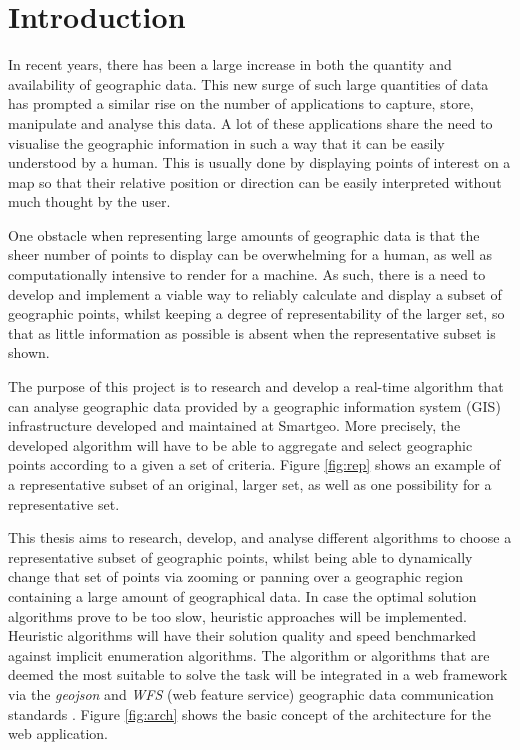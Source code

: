 \chapter{Introduction}
\label{chap:intro}

In recent years, there has been a large increase in both the quantity and availability of geographic data. This new surge of such large quantities of data has prompted a similar rise on the number of applications to capture, store, manipulate and analyse this data.
A lot of these applications share the need to visualise the geographic information in such a way that it can be easily understood by a human.
This is usually done by displaying points of interest on a map so that their relative position or direction can be easily interpreted without much thought by the user.

One obstacle when representing large amounts of geographic data is that the sheer number of points to display can be overwhelming for a human, as well as computationally intensive to render for a machine. As such, there is a need to develop and implement a viable way to reliably calculate and display a subset of geographic points, whilst keeping a degree of representability of the larger set, so that as little information as possible is absent when the representative subset is shown.

The purpose of this project is to research and develop a real-time algorithm that can analyse geographic data provided by a geographic information system (GIS) infrastructure developed and maintained at Smartgeo. More precisely, the developed algorithm will have to be able to aggregate and select geographic points according to a given a set of criteria. Figure \ref{fig:rep} shows an example of a representative subset of an original, larger set, as well as one possibility for a representative set.



This thesis aims to research, develop, and analyse different algorithms to choose a representative subset of geographic points, whilst being able to dynamically change that set of points via zooming or panning over a geographic region containing a large amount of geographical data. In case the optimal solution algorithms prove to be too slow, heuristic approaches will be implemented. Heuristic algorithms will have their solution quality and speed benchmarked against implicit enumeration algorithms.
The algorithm or algorithms that are deemed the most suitable to solve the task will be integrated in a web framework via the \emph{geojson} and \emph{WFS} (web feature service) geographic data communication standards . Figure \ref{fig:arch} shows the basic concept of the architecture for the web application.

